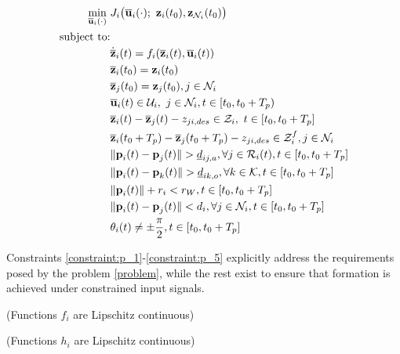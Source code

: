 \begin{align}
  \min\limits_{\overline{\bm{\mathbf{u}}}_i (\cdot)}\ &
    J_i \big(\overline{\bm{\mathbf{u}}}_i (\cdot);\ \bm{\mathbf{z}}_i(t_0), \bm{\mathbf{z}}_{\mathcal{N}_i}(t_0)\big) \\
  \text{subject to:} & \\
  & \dot{\overline{\bm{\mathbf{z}}}}_i(t) = f_i (\overline{\bm{\mathbf{z}}}_i (t), \overline{\bm{\mathbf{u}}}_i (t)) \\
  & \overline{\bm{\mathbf{z}}}_i (t_0) = \bm{\mathbf{z}}_i (t_0) \\
  & \overline{\bm{\mathbf{z}}}_j (t_0) = \bm{\mathbf{z}}_j (t_0), j \in \mathcal{N}_i \\
  & \overline{\bm{\mathbf{u}}}_i(t) \in \mathcal{U}_i,\ j \in \mathcal{N}_i, t \in [t_0, t_0 + T_p)\\
  & \overline{\bm{\mathbf{z}}}_i (t) - \overline{\bm{\mathbf{z}}}_j (t) - z_{ji, des} \in \mathcal{Z}_i,\ t \in [t_0, t_0 + T_p]\\
  & \overline{\bm{\mathbf{z}}}_i (t_0 + T_p) - \overline{\bm{\mathbf{z}}}_j (t_0 + T_p) - z_{ji,des} \in \mathcal{Z}_i^f, j \in \mathcal{N}_i \\
  & \|\bm{\mathbf{p}}_i(t) - \bm{\mathbf{p}}_j(t)\| > \underline{d}_{ij,a}, \forall j \in \mathcal{R}_i(t), t \in [t_0, t_0 + T_p] \label{constraint:p_1}\\
  & \|\bm{\mathbf{p}}_i(t) - \bm{\mathbf{p}}_k(t)\| > \underline{d}_{ik,o}, \forall k \in \mathcal{K}, t \in [t_0, t_0 + T_p] \\
  & \|\bm{\mathbf{p}}_i(t)\| + r_i < r_W, t \in [t_0, t_0 + T_p] \\
  & \|\bm{\mathbf{p}}_i(t) - \bm{\mathbf{p}}_j(t)\| < d_i, \forall j \in \mathcal{N}_i, t \in [t_0, t_0 + T_p] \\
  & \theta_i(t) \ne \pm \frac{\pi}{2}, t \in [t_0, t_0 + T_p] \label{constraint:p_5}
\end{align}

Constraints \ref{constraint:p_1}-\ref{constraint:p_5} explicitly address the
requirements posed by the problem \eqref{problem}, while the rest exist to
ensure that formation is achieved under constrained input signals.


\begin{gg_box}
\begin{assumption} (Functions $f_i$ are Lipschitz continuous)
  \label{ass:f_i_Lipschitz}
\end{assumption}
\end{gg_box}

\begin{gg_box}
\begin{assumption} (Functions $h_i$ are Lipschitz continuous)
  \label{ass:h_i_Lipschitz}
\end{assumption}
\end{gg_box}

